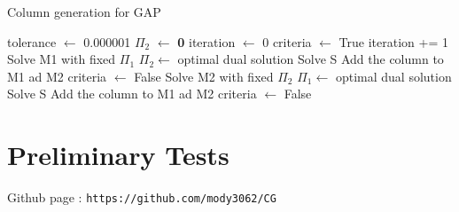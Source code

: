 \documentclass[12pt]{article}
\begin{document}
	
		\begin{algorithm}
		\caption{Column generation for GAP} \label{alg:cg}
		\begin{algorithmic}[1]
			\State tolerance $\leftarrow$ 0.000001
			\State $\Pi_2$ $\leftarrow$ \textbf{0}
			\State iteration $\leftarrow$ 0
			\State criteria $\leftarrow$ True 
			\State iteration += 1
				\State Solve M1 with fixed $\Pi_1$
				\State $\Pi_2 \leftarrow$ optimal dual solution
				\State Solve S
					\State Add the column to M1 ad M2
						\qquad \qquad \qquad {}
					\Else 
					\State criteria $\leftarrow$ False
					\EndIf
			\Else
				\State Solve M2 with fixed $\Pi_2$
				\State $\Pi_1 \leftarrow$ optimal dual solution
				\State Solve S
					\State Add the column to M1 ad M2
					\qquad \qquad \qquad {}
					\Else 
					\State criteria $\leftarrow$ False
					\EndIf
			\EndIf
			\EndWhile
		\end{algorithmic}
	\end{algorithm}

	
\section{Preliminary Tests}
Github page : \texttt{https://github.com/mody3062/CG}
\end{document}
